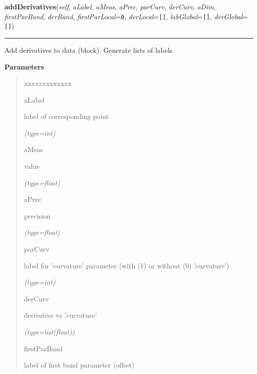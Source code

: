 \hspace{.8\funcindent}\begin{boxedminipage}{\funcwidth}

    \raggedright \textbf{addDerivatives}(\textit{self}, \textit{aLabel}, \textit{aMeas}, \textit{aPrec}, \textit{parCurv}, \textit{derCurv}, \textit{aDim}, \textit{firstParBand}, \textit{derBand}, \textit{firstParLocal}={\tt 0}, \textit{derLocal}={\tt \texttt{[}\texttt{]}}, \textit{labGlobal}={\tt \texttt{[}\texttt{]}}, \textit{derGlobal}={\tt \texttt{[}\texttt{]}})

    \vspace{-1.5ex}

    \rule{\textwidth}{0.5\fboxrule}
\setlength{\parskip}{2ex}
    Add derivatives to data (block). Generate lists of labels.

\setlength{\parskip}{1ex}
      \textbf{Parameters}
      \vspace{-1ex}

      \begin{quote}
        \begin{Ventry}{xxxxxxxxxxxxx}

          \item[aLabel]

          label of corresponding point

            {\it (type=int)}

          \item[aMeas]

          value

            {\it (type=float)}

          \item[aPrec]

          precision

            {\it (type=float)}

          \item[parCurv]

          label for 'curvature' parameter (with (1) or without (0) 
          'curvature')

            {\it (type=int)}

          \item[derCurv]

          derivative vs 'curvature'

            {\it (type=list(float))}

          \item[firstParBand]

          label of first band parameter (offset)


\end{Ventry}
\end{quote}
\end{boxedminipage}
